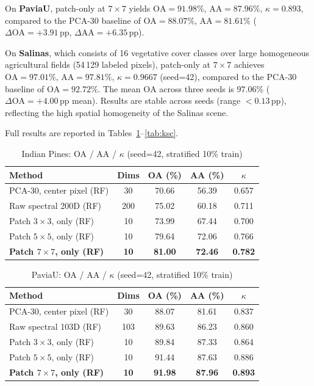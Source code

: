 \documentclass[journal]{IEEEtran}
\newcommand{\pp}{\,\text{pp}}
\newcommand{\OA}{\ensuremath{\mathrm{OA}}}
\newcommand{\Acc}{\ensuremath{\mathrm{AA}}}  %
\begin{document}
On \textbf{PaviaU}, patch-only at $7{\times}7$ yields $\OA{=}91.98\%$,
$\Acc{=}87.96\%$, $\kappa{=}0.893$, compared to the PCA-30 baseline of
$\OA{=}88.07\%$, $\Acc{=}81.61\%$ ($\Delta\OA{=}+3.91\pp$,
$\Delta\Acc{=}+6.35\pp$).

On \textbf{Salinas}, which consists of 16 vegetative cover classes
over large homogeneous agricultural fields (54\,129 labeled pixels),
patch-only at $7{\times}7$ achieves $\OA{=}97.01\%$,
$\Acc{=}97.81\%$, $\kappa{=}0.9667$ (seed=42), compared to the PCA-30
baseline of $\OA{=}92.72\%$. The mean $\OA$ across three seeds is
$97.06\%$ ($\Delta\OA{=}+4.00\pp$ mean). Results are stable across
seeds (range $< 0.13\pp$), reflecting the high spatial homogeneity of
the Salinas scene.

Full results are reported in Tables~\ref{tab:indian_pines}--\ref{tab:ksc}.

\begin{table}[t]
\centering
\caption{Indian Pines: OA / AA / $\kappa$ (seed=42, stratified 10\% train)}
\label{tab:indian_pines}
\begin{tabular}{lcccc}
\toprule
Method & Dims & OA (\%) & AA (\%) & $\kappa$ \\
\midrule
PCA-30, center pixel (RF)    & 30  & 70.66 & 56.39 & 0.657 \\
Raw spectral 200D (RF)       & 200 & 75.02 & 60.18 & 0.711 \\
Patch $3{\times}3$, only (RF)& 10  & 73.99 & 67.44 & 0.700 \\
Patch $5{\times}5$, only (RF)& 10  & 79.64 & 72.06 & 0.766 \\
\textbf{Patch $7{\times}7$, only (RF)}
                             &\textbf{10}&\textbf{81.00}&\textbf{72.46}&\textbf{0.782}\\
\bottomrule
\end{tabular}
\end{table}

\begin{table}[t]
\centering
\caption{PaviaU: OA / AA / $\kappa$ (seed=42, stratified 10\% train)}
\label{tab:pavia}
\begin{tabular}{lcccc}
\toprule
Method & Dims & OA (\%) & AA (\%) & $\kappa$ \\
\midrule
PCA-30, center pixel (RF)    & 30  & 88.07 & 81.61 & 0.837 \\
Raw spectral 103D (RF)       & 103 & 89.63 & 86.23 & 0.860 \\
Patch $3{\times}3$, only (RF)& 10  & 89.84 & 87.33 & 0.864 \\
Patch $5{\times}5$, only (RF)& 10  & 91.44 & 87.63 & 0.886 \\
\textbf{Patch $7{\times}7$, only (RF)}
                             &\textbf{10}&\textbf{91.98}&\textbf{87.96}&\textbf{0.893}\\
\bottomrule
\end{tabular}
\end{table}
\end{document}
